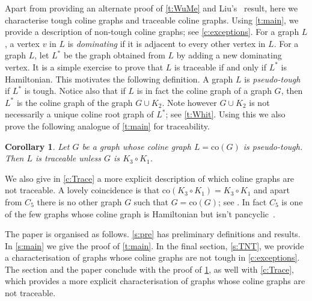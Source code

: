 \documentclass[12pt]{article}
\newtheorem{cor}[thm]{Corollary}
\theoremstyle{definition}
\newcommand{\co}{\text{co}}
\begin{document}
Apart from providing an alternate proof of \cref{t:WuMe} and Liu's~\cite{Li05} result, here we characterise tough coline graphs and traceable coline graphs. Using \cref{t:main}, 
we provide a description of non-tough coline graphs; see \cref{c:exceptions}. 
For a graph $L$, a vertex $v$ in $L$ is \emph{dominating} if it is adjacent to every other vertex in $L$.
For a graph $L$, let $L^*$ be the graph obtained from $L$ by adding a new dominating vertex.
It is a simple exercise to prove that $L$ is traceable if and only if $L^*$ is Hamiltonian. This motivates the following definition. A graph $L$ is \emph{pseudo-tough} if $L^*$ is tough. 
Notice also that if $L$ is in fact the coline graph of a graph $G$, then $L^*$ is the coline graph of the graph $G \cup K_2$. Note however $G \cup K_2$ is not necessarily a unique coline root graph of $L^*$; see \cref{t:Whit}.
Using this we also prove the following analogue of \cref{t:main} for traceability.
\begin{cor}\label{c:main}
Let $G$ be a graph whose coline graph $L=\co(G)$ is pseudo-tough. Then $L$ is traceable unless $G$ is $ K_3\circ K_1$. 
\end{cor}
\noindent
We also give in \cref{c:Trace} a more explicit description of which coline graphs are not traceable.
A lovely coincidence is that $\co(K_3\circ K_1)=K_3\circ K_1$ and apart from $C_5$ there is no other graph $G$ such that $G=\co(G)$; see \cite{Ai69}. In fact $C_5$ is one of the few graphs whose coline graph is Hamiltonian but isn't pancyclic~\cite{Li05}.

The paper is organised as follows. \cref{s:pre} has preliminary definitions and results. In \cref{s:main} we give the proof of \cref{t:main}. In the final section, \cref{s:TNT}, we provide a characterisation of graphs whose coline graphs are not tough in \cref{c:exceptions}. The section and the paper conclude with the proof of \cref{c:main}, as well with \cref{c:Trace}, which provides a more explicit characterisation of graphs whose coline graphs are not traceable.
\end{document}

